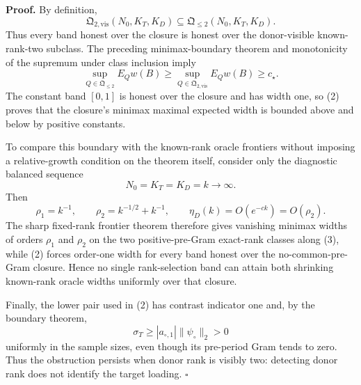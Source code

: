 \textbf{Proof.}
By definition,
\[
 \mathfrak Q_{2,\mathrm{vis}}(N_0,K_T,K_D)
 \subseteq\mathfrak Q_{\leq2}(N_0,K_T,K_D).             \tag{1}
\]
Thus every band honest over the closure is honest over the donor-visible known-rank-two subclass.  The preceding minimax-boundary theorem and monotonicity of the supremum under class inclusion imply
\[
 \sup_{Q\in\mathfrak Q_{\leq2}}E_Qw(B)
 \ge \sup_{Q\in\mathfrak Q_{2,\mathrm{vis}}}E_Qw(B)
 \ge c_\star.                                           \tag{2}
\]
The constant band \([0,1]\) is honest over the closure and has width one, so (2) proves that the closure's minimax maximal expected width is bounded above and below by positive constants.

To compare this boundary with the known-rank oracle frontiers without imposing a relative-growth condition on the theorem itself, consider only the diagnostic balanced sequence
\[
 N_0=K_T=K_D=k\longrightarrow\infty.                    \tag{3}
\]
Then
\[
 \rho_1=k^{-1},
 \qquad
 \rho_2=k^{-1/2}+k^{-1},
 \qquad
 \eta_D(k)=O(e^{-ck})=O(\rho_2).                        \tag{4}
\]
The sharp fixed-rank frontier theorem therefore gives vanishing minimax widths of orders \(\rho_1\) and \(\rho_2\) on the two positive-pre-Gram exact-rank classes along (3), while (2) forces order-one width for every band honest over the no-common-pre-Gram closure.  Hence no single rank-selection band can attain both shrinking known-rank oracle widths uniformly over that closure.

Finally, the lower pair used in (2) has contrast indicator one and, by the boundary theorem,
\[
 \sigma_T\ge |a_{\circ,1}|\|\psi_\circ\|_2>0            \tag{5}
\]
uniformly in the sample sizes, even though its pre-period Gram tends to zero.  Thus the obstruction persists when donor rank is visibly two: detecting donor rank does not identify the target loading. \(\square\)